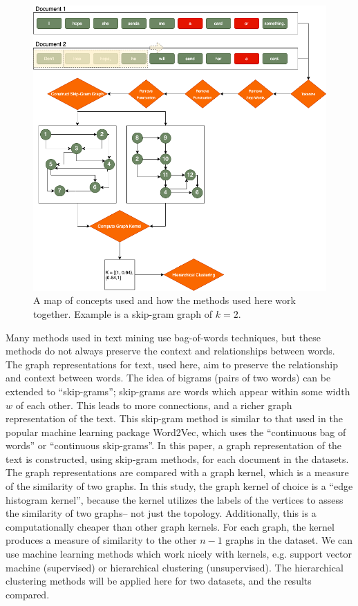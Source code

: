 \begin{figure}
 \includegraphics[width=6in]{Content/Images/Concept_map.png}
 \caption{A map of concepts used and how the methods used here work together. Example is a skip-gram graph of $k=2$.}
 \end{figure}

\hspace*{0.3cm} Many methods used in text mining use bag-of-words techniques, but these methods do not always preserve the context and relationships between words. The graph representations for text, used here, aim to preserve the relationship and context between words. The idea of bigrams (pairs of two words) can be extended to ``skip-grams”; skip-grams are words which appear within some width $w$ of each other. This leads to more connections, and a richer graph representation of the text. This skip-gram method is similar to that used in the popular machine learning package Word2Vec, which uses the “continuous bag of words” or ``continuous skip-grams”. In this paper, a graph representation of the text is constructed, using skip-gram methods, for each document in the datasets. \\

The graph representations are compared with a graph kernel, which is a measure of the similarity of two graphs. In this study, the graph kernel of choice is a ``edge histogram kernel”, because the kernel utilizes the labels of the vertices to assess the similarity of two graphs– not just the topology. Additionally, this is a computationally cheaper than other graph kernels. For each graph, the kernel produces a measure of similarity to the other $n-1$ graphs in the dataset. We can use machine learning methods which work nicely with kernels, e.g. support vector machine (supervised) or hierarchical clustering (unsupervised). The hierarchical clustering methods will be applied here for two datasets, and the results compared.\\

